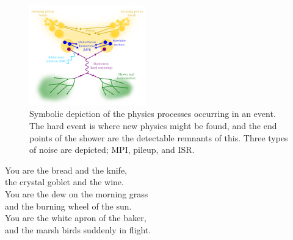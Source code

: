 \documentclass{article}
\begin{document}
    \begin{figure}[ht]
        \centering
        \includegraphics[width=5cm]{event_parts}
        \caption{Symbolic depiction of the physics processes occurring in an event.
                 The hard event is where new physics might be found,
                 and the end points of the shower are the detectable remnants of this.
                 Three types of noise are depicted; MPI, pileup, and ISR.
             }
    \end{figure}


    You are the bread and the knife,\\
    the crystal goblet and the wine.\\
    You are the dew on the morning grass\\
    and the burning wheel of the sun.\\
    You are the white apron of the baker,\\
    and the marsh birds suddenly in flight.\\
\end{document}
